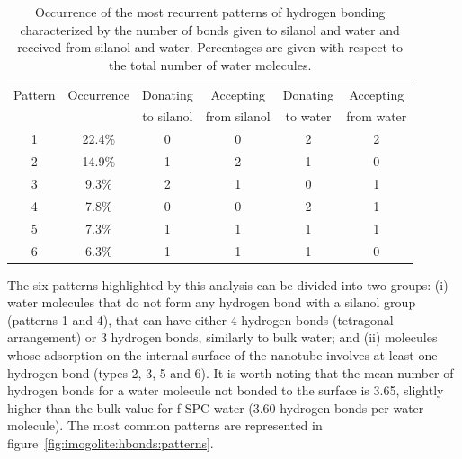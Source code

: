 \documentclass[thesis]{subfiles}
\begin{document}
\begin{table}[ht]
    \centering
    \caption{Occurrence of the most recurrent patterns of hydrogen bonding
    characterized by the number of bonds given to silanol and water and received
    from silanol and water. Percentages are given with respect to the total
    number of water molecules.}
    \label{tab:imogolite:hbonds:patterns}
    \begin{tabular}{c c c c c c}
        \toprule
        Pattern & Occurrence & Donating   & Accepting    & Donating & Accepting  \\
                &            & to silanol & from silanol & to water & from water \\
        \midrule
            1   & 22.4\%     &      0     &      0       &    2     &     2      \\
            2   & 14.9\%     &      1     &      2       &    1     &     0      \\
            3   & 9.3\%      &      2     &      1       &    0     &     1      \\
            4   & 7.8\%      &      0     &      0       &    2     &     1      \\
            5   & 7.3\%      &      1     &      1       &    1     &     1      \\
            6   & 6.3\%      &      1     &      1       &    1     &     0      \\
        \bottomrule
    \end{tabular}
\end{table}

The six patterns highlighted by this analysis can be divided into two groups: (i)
water molecules that do not form any hydrogen bond with a silanol group
(patterns 1 and 4), that can have either 4 hydrogen bonds (tetragonal
arrangement) or 3 hydrogen bonds, similarly to bulk water; and (ii) molecules whose
adsorption on the internal surface of the nanotube involves at least one hydrogen
bond (types 2, 3, 5 and 6). It is worth noting that the mean number of hydrogen
bonds for a water molecule not bonded to the surface is 3.65, slightly higher
than the bulk value for f-SPC water (3.60 hydrogen bonds per water molecule).
The most common patterns are represented in figure~\ref{fig:imogolite:hbonds:patterns}.
\end{document}
